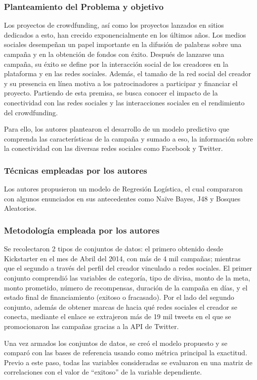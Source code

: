 \subsubsection{Planteamiento del Problema y objetivo}
Los proyectos de crowdfunding, así como los proyectos lanzados en sitios dedicados a esto, han crecido exponencialmente en los últimos años. Los medios sociales desempeñan un papel importante en la difusión de palabras sobre una campaña y en la obtención de fondos con éxito. Después de lanzarse una campaña, su éxito se define por la interacción social de los creadores en la plataforma y en las redes sociales. Además, el tamaño de la red social del creador y su presencia en línea motiva a los patrocinadores a participar y financiar el proyecto. Partiendo de esta premisa, se busca conocer el impacto de la conectividad con las redes sociales y las interacciones sociales en el rendimiento del crowdfunding.

Para ello, los autores plantearon el desarrollo de un modelo predictivo que comprenda las características de la campaña y sumado a eso, la información sobre la conectividad con las diversas redes sociales como Facebook y Twitter.

\subsubsection{Técnicas empleadas por los autores}
Los autores propusieron un modelo de Regresión Logística, el cual compararon con algunos enunciados en sus antecedentes como Naïve Bayes, J48 y Bosques Aleatorios.

\subsubsection{Metodología empleada por los autores}
Se recolectaron 2 tipos de conjuntos de datos: el primero obtenido desde Kickstarter en el mes de Abril del 2014, con más de 4 mil campañas; mientras que el segundo a través del perfil del creador vinculado a redes sociales. El primer conjunto comprendió las variables de categoría, tipo de divisa, monto de la meta, monto prometido, número de recompensas, duración de la campaña en días, y el estado final de financiamiento (exitoso o fracasado). Por el lado del segundo conjunto, además de obtener marcas de hacia qué redes sociales el creador se conecta, mediante el enlace se extrajeron más de 19 mil tweets en el que se promocionaron las campañas gracias a la API de Twitter.

Una vez armados los conjuntos de datos, se creó el modelo propuesto y se comparó con las bases de referencia usando como métrica principal la exactitud. Previo a este paso, todas las variables consideradas se evaluaron en una matriz de correlaciones con el valor de “exitoso” de la variable dependiente.

